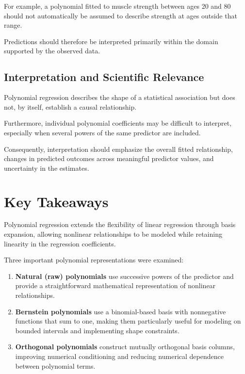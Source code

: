 \documentclass[
  letterpaper,
  DIV=11,
  numbers=noendperiod]{scrreprt}
\begin{document}
For example, a polynomial fitted to muscle strength between ages 20 and
80 should not automatically be assumed to describe strength at ages
outside that range.

Predictions should therefore be interpreted primarily within the domain
supported by the observed data.

\subsection{Interpretation and Scientific
Relevance}\label{interpretation-and-scientific-relevance}

Polynomial regression describes the shape of a statistical association
but does not, by itself, establish a causal relationship.

Furthermore, individual polynomial coefficients may be difficult to
interpret, especially when several powers of the same predictor are
included.

Consequently, interpretation should emphasize the overall fitted
relationship, changes in predicted outcomes across meaningful predictor
values, and uncertainty in the estimates.

\section{Key Takeaways}\label{key-takeaways}

Polynomial regression extends the flexibility of linear regression
through basis expansion, allowing nonlinear relationships to be modeled
while retaining linearity in the regression coefficients.

Three important polynomial representations were examined:

\begin{enumerate}
\def\labelenumi{\arabic{enumi}.}
\item
  \textbf{Natural (raw) polynomials} use successive powers of the
  predictor and provide a straightforward mathematical representation of
  nonlinear relationships.
\item
  \textbf{Bernstein polynomials} use a binomial-based basis with
  nonnegative functions that sum to one, making them particularly useful
  for modeling on bounded intervals and implementing shape constraints.
\item
  \textbf{Orthogonal polynomials} construct mutually orthogonal basis
  columns, improving numerical conditioning and reducing numerical
  dependence between polynomial terms.
\end{enumerate}
\end{document}
